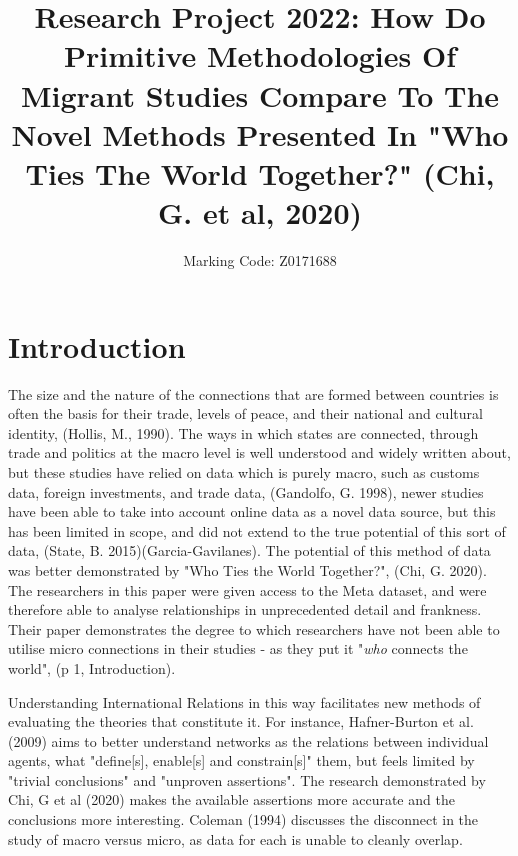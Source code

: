 \documentclass[12pt]{article}
\date{}
\author{Marking Code: Z0171688}
\title{
Research Project 2022: How Do Primitive Methodologies Of Migrant Studies Compare To The Novel Methods 
Presented In "Who Ties The World Together?" (Chi, G. et al, 2020)
}
\begin{document}
\parindent=20pt

\maketitle

\section{Introduction}

The size and the nature of the connections that are formed between countries is often the 
basis for their trade, levels of peace, and their national and cultural identity, (Hollis, M., 1990). 
The ways in which states are connected, through trade and politics at the macro level is 
well understood and widely written about, but these studies have relied 
on data which is purely macro, such as customs data, foreign investments, and trade 
data, (Gandolfo, G. 1998), newer studies have been able to take into account online data 
as a novel data source, but this has been limited in scope, and did not extend to the
true potential of this sort of data, (State, B. 2015)(Garcia-Gavilanes).
The potential of this method of data was better demonstrated by "Who Ties the World Together?", (Chi, G. 2020).
The researchers in this paper were given access to the Meta dataset, and were therefore able to 
analyse relationships in unprecedented detail and frankness. Their paper demonstrates the degree
to which researchers have not been able to utilise micro connections in their studies - as they 
put it "\textit{who} connects the world", (p 1, Introduction). 

Understanding International Relations in this way facilitates new methods of evaluating the 
theories that constitute it. For instance, Hafner-Burton et al. (2009) aims to better 
understand networks as the relations between individual agents, what "define[s], enable[s] and 
constrain[s]" them, but feels limited by "trivial conclusions" and "unproven assertions". 
The research demonstrated by Chi, G et al (2020) makes the available assertions more accurate
and the conclusions more interesting. Coleman (1994) discusses the disconnect in the study  
of macro versus micro, as data for each is unable to cleanly overlap.
\end{document}
